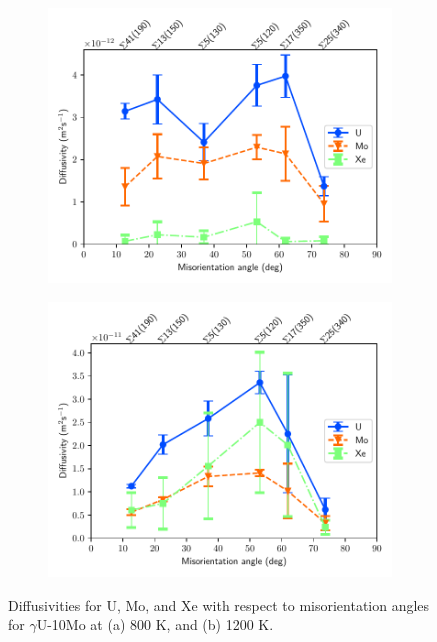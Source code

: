 \documentclass{elsarticle}
\begin{document}
\begin{figure}[!ht]
    \centering
    \begin{subfigure}{0.49\textwidth}
        \centering
        \caption{}
        \includegraphics[width=\textwidth]{DvsTilt_10mo_2.pdf}
    \end{subfigure}
    \begin{subfigure}{0.49\textwidth}
        \centering
        \caption{}
        \includegraphics[width=\textwidth]{DvsTilt_10mo.pdf}
    \end{subfigure}
\caption{Diffusivities for U, Mo, and Xe with respect to misorientation angles for $\gamma$U-10Mo at (a) 800 K, and (b) 1200 K.}
\label{fig:dvstilt}
\end{figure}
\end{document}
